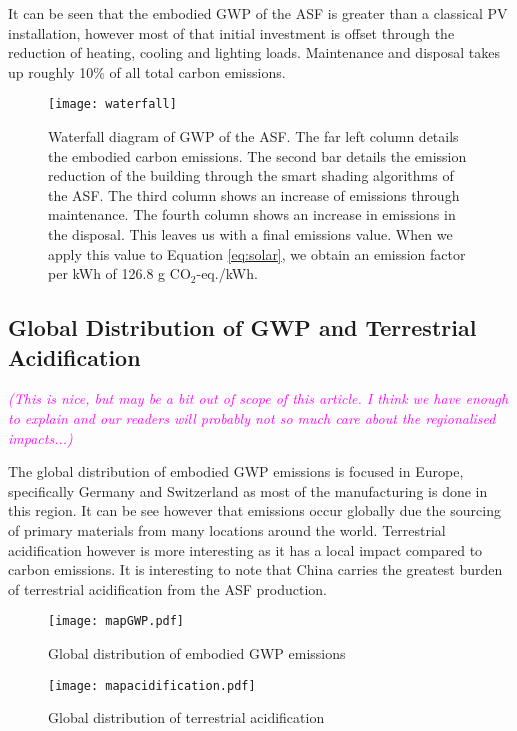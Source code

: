 It can be seen that the embodied GWP of the ASF is greater than a classical PV installation, however most of that initial investment is offset through the reduction of heating, cooling and lighting loads. Maintenance and disposal takes up roughly 10\% of all total carbon emissions.


\begin{figure}[H]
\begin{center}
\texttt{[image: waterfall]}
\caption{Waterfall diagram of GWP of the ASF. The far left column details the embodied carbon emissions. The second bar details the emission reduction of the building through the smart shading algorithms of the ASF. The third column shows an increase of emissions through maintenance. The fourth column shows an increase in emissions in the disposal. This leaves us with a final emissions value. When we apply this value to Equation \ref{eq:solar}, we obtain an emission factor per kWh of 126.8 g CO$_2$-eq./kWh.}
\label{fig:waterfall}
\end{center}
\end{figure}

\subsection{Global Distribution of GWP and Terrestrial Acidification}
\textcolor{magenta}{\textit{(This is nice, but may be a bit out of scope of this article. I think we have enough to explain and our readers will probably not so much care about the regionalised impacts...)}}

The global distribution of embodied GWP emissions is focused in Europe, specifically Germany and Switzerland as most of the manufacturing is done in this region. It can be see however that emissions occur globally due the sourcing of primary materials from many locations around the world. Terrestrial acidification however is more interesting as it has a local impact compared to carbon emissions. It is interesting to note that China carries the greatest burden of terrestrial acidification from the ASF production. 
\begin{figure}[H]
\begin{center}
\texttt{[image: mapGWP.pdf]}
\caption{Global distribution of embodied GWP emissions}
\label{fig:mapGWP}
\end{center}
\end{figure}

\begin{figure}[H]
\begin{center}
\texttt{[image: mapacidification.pdf]}
\caption{Global distribution of terrestrial acidification}
\label{fig:mapAcid}
\end{center}
\end{figure}



